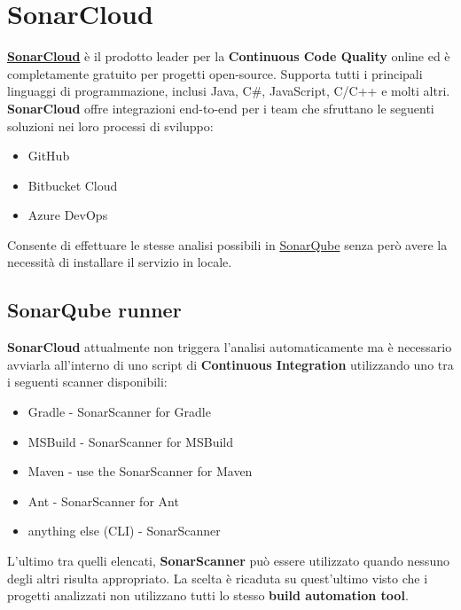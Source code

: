 \section{SonarCloud}\label{sonar}
 \href{https://sonarcloud.io}{\textbf{SonarCloud}} è il prodotto leader per la \textbf{Continuous Code Quality} online ed è completamente gratuito per progetti open-source. Supporta tutti i principali linguaggi di programmazione, inclusi Java, C\#, JavaScript, C/C++ e molti altri. \textbf{SonarCloud} offre integrazioni end-to-end per i team che sfruttano le seguenti soluzioni nei loro processi di sviluppo:
\begin{itemize}
	\item GitHub
	\item Bitbucket Cloud
	\item Azure DevOps
\end{itemize}
Consente di effettuare le stesse analisi possibili in \href{https://www.sonarqube.org/}{SonarQube} senza però avere la necessità di installare il servizio in locale.
\subsection{SonarQube runner}
\textbf{SonarCloud} attualmente non triggera l'analisi automaticamente ma è necessario avviarla all'interno di uno script di \textbf{Continuous Integration} utilizzando uno tra i seguenti scanner disponibili:
\begin{itemize}
	\item Gradle - SonarScanner for Gradle
	\item MSBuild - SonarScanner for MSBuild
	\item Maven - use the SonarScanner for Maven
	\item Ant - SonarScanner for Ant
	\item anything else (CLI) - SonarScanner	
\end{itemize}
L'ultimo tra quelli elencati, \textbf{SonarScanner} può essere utilizzato quando nessuno degli altri risulta appropriato. La scelta è ricaduta su quest'ultimo visto che i progetti analizzati non utilizzano tutti lo stesso \textbf{build automation tool}. 
